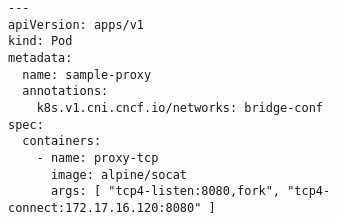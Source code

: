 \begin{lstfloat}
\begin{lstlisting}[style=mybashstyle,
caption={Ukázka konfigurace podu s Proxy},
label={sample:proxy}
]
---
apiVersion: apps/v1
kind: Pod
metadata:
  name: sample-proxy
  annotations:
    k8s.v1.cni.cncf.io/networks: bridge-conf
spec:
  containers:
    - name: proxy-tcp
      image: alpine/socat
      args: [ "tcp4-listen:8080,fork", "tcp4-connect:172.17.16.120:8080" ]
\end{lstlisting}
\end{lstfloat}
